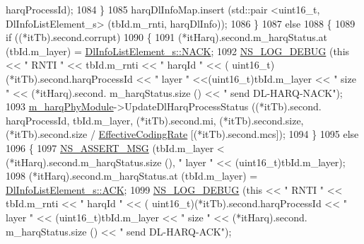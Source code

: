 \begin{DoxyCode}
      harqProcessId);
1084                               \}
1085                             harqDlInfoMap.insert (std::pair <uint16\_t, DlInfoListElement\_s> (tbId.m\_rnti, 
      harqDlInfo));
1086                           \}
1087                         \textcolor{keywordflow}{else}
1088                         \{
1089                           \textcolor{keywordflow}{if} ((*itTb).second.corrupt)
1090                             \{
1091                               (*itHarq).second.m\_harqStatus.at (tbId.m\_layer) = 
      \hyperlink{structns3_1_1DlInfoListElement__s_a3e55b89f756b7bd8909c8116a202a17aaf90e76e67c86729b4ee21927b7fb1770}{DlInfoListElement\_s::NACK};
1092                               \hyperlink{group__logging_ga413f1886406d49f59a6a0a89b77b4d0a}{NS\_LOG\_DEBUG} (\textcolor{keyword}{this} << \textcolor{stringliteral}{" RNTI "} << tbId.m\_rnti << \textcolor{stringliteral}{" harqId "} << (
      uint16\_t)(*itTb).second.harqProcessId << \textcolor{stringliteral}{" layer "} <<(uint16\_t)tbId.m\_layer << \textcolor{stringliteral}{" size "} << (*itHarq).second.
      m\_harqStatus.size () << \textcolor{stringliteral}{" send DL-HARQ-NACK"});
1093                               \hyperlink{classns3_1_1LteSpectrumPhy_a6febfefe8b9da4a5559c5bb08bf77f26}{m\_harqPhyModule}->UpdateDlHarqProcessStatus ((*itTb).second.
      harqProcessId, tbId.m\_layer, (*itTb).second.mi, (*itTb).second.size, (*itTb).second.size / 
      \hyperlink{namespacens3_af70af4887722b3badf3d57ca573d9502}{EffectiveCodingRate} [(*itTb).second.mcs]);
1094                             \}
1095                           \textcolor{keywordflow}{else}
1096                             \{
1097                               \hyperlink{assert_8h_aff5ece9066c74e681e74999856f08539}{NS\_ASSERT\_MSG} (tbId.m\_layer < (*itHarq).second.m\_harqStatus.size
       (), \textcolor{stringliteral}{" layer "} << (uint16\_t)tbId.m\_layer);
1098                               (*itHarq).second.m\_harqStatus.at (tbId.m\_layer) = 
      \hyperlink{structns3_1_1DlInfoListElement__s_a3e55b89f756b7bd8909c8116a202a17aad38ddc6546e38c8a4ca738262e0401a2}{DlInfoListElement\_s::ACK};
1099                               \hyperlink{group__logging_ga413f1886406d49f59a6a0a89b77b4d0a}{NS\_LOG\_DEBUG} (\textcolor{keyword}{this} << \textcolor{stringliteral}{" RNTI "} << tbId.m\_rnti << \textcolor{stringliteral}{" harqId "} << (
      uint16\_t)(*itTb).second.harqProcessId << \textcolor{stringliteral}{" layer "} << (uint16\_t)tbId.m\_layer << \textcolor{stringliteral}{" size "} << (*itHarq).second.
      m\_harqStatus.size () << \textcolor{stringliteral}{" send DL-HARQ-ACK"});

\end{DoxyCode}
